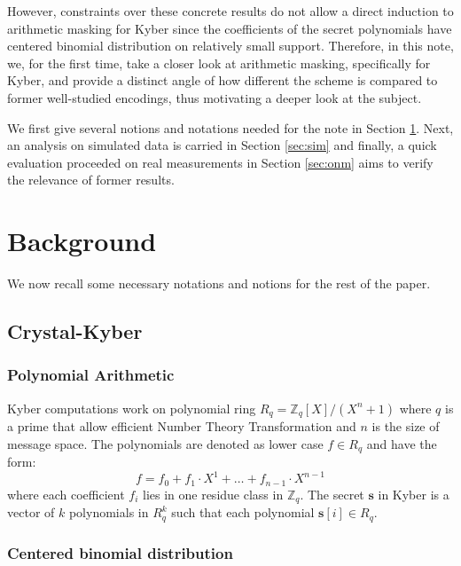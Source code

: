 \documentclass{llncs}
\begin{document}
However, constraints over these concrete results do not allow a direct induction to arithmetic masking for Kyber since the coefficients of the secret polynomials have centered binomial distribution on relatively small support.
Therefore, in this note, we, for the first time, take a closer look at arithmetic masking, specifically for Kyber, and provide a distinct angle of how different the scheme is compared to former well-studied encodings, thus motivating a deeper look at the subject.

We first give several notions and notations needed for the note in Section \ref{sec:bg}. Next, an analysis on simulated data is carried in Section \ref{sec:sim} and finally, a quick evaluation proceeded on real measurements in Section \ref{sec:onm} aims to verify the relevance of former results.
\section{Background}\label{sec:bg}
We now recall some necessary notations and notions for the rest of the paper.
\subsection*{Crystal-Kyber}
\subsubsection*{Polynomial Arithmetic}
Kyber computations work on polynomial ring $R_q = \mathbb{Z}_q[X]/(X^n + 1)$ where $q$ is a prime that allow efficient Number Theory Transformation and $n$ is the size of message space. 
The polynomials are denoted as lower case $f \in R_q$ and have the form:
\begin{equation}
	f = f_0 + f_1\cdot X^1 + \dots + f_{n-1}\cdot X^{n-1}
\end{equation}
where each coefficient $f_i$ lies in one residue class in $\mathbb{Z}_q$.
The secret $\mathbf{s}$ in Kyber is a vector of $k$ polynomials in $R^k_q$ such that each polynomial $\mathbf{s}[i] \in R_q$.
\subsubsection*{Centered binomial distribution}
\end{document}
